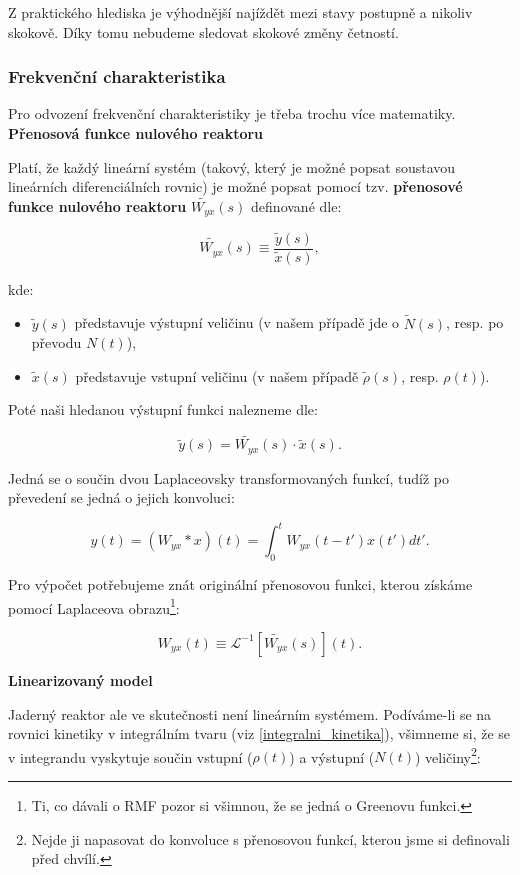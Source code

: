 Z praktického hlediska je výhodnější najíždět mezi stavy postupně a nikoliv skokově. Díky tomu nebudeme sledovat skokové změny četností.

\subsubsection{Frekvenční charakteristika}

Pro odvození frekvenční charakteristiky je třeba trochu více matematiky.\\

\textbf{Přenosová funkce nulového reaktoru}

Platí, že každý lineární systém (takový, který je možné popsat soustavou lineárních diferenciálních rovnic) je možné popsat pomocí tzv. \textbf{přenosové funkce nulového reaktoru} $\tilde{W_{yx}}(s)$ definované dle:

\begin{equation}
  \boxed{
  \tilde{W_{yx}}(s) \equiv \dfrac{\tilde{y}(s)}{\tilde{x}(s)},
  \label{prenosova_funkce_definice}}
\end{equation}

kde:

\begin{itemize}
  \item $\tilde{y}(s)$ představuje výstupní veličinu (v našem případě jde o $\tilde{N}(s)$, resp. po převodu $N(t)$),
  \item $\tilde{x}(s)$ představuje vstupní veličinu (v našem případě $\tilde{\rho}(s)$, resp. $\rho(t)$).
\end{itemize}

Poté naši hledanou výstupní funkci nalezneme dle:

$$ \tilde{y}(s) = \tilde{W_{yx}}(s) \cdot \tilde{x}(s). $$

Jedná se o součin dvou Laplaceovsky transformovaných funkcí, tudíž po převedení se jedná o jejich konvoluci:

$$ y(t) = (W_{yx} * x ) (t) = \int_0^t W_{yx}(t-t') x(t') dt'. $$

Pro výpočet potřebujeme znát originální přenosovou funkci, kterou získáme pomocí Laplaceova obrazu\footnote{Ti, co dávali o RMF pozor si všimnou, že se jedná o Greenovu funkci.}:

$$ W_{yx}(t) \equiv \mathcal{L}^{-1}[\tilde{W_{yx}}(s)](t). $$

\textbf{Linearizovaný model}

Jaderný reaktor ale ve skutečnosti není lineárním systémem. Podíváme-li se na rovnici kinetiky v integrálním tvaru (viz \eqref{integralni_kinetika}), všimneme si, že se v integrandu vyskytuje součin vstupní ($\rho(t)$) a výstupní ($N(t)$) veličiny\footnote{Nejde ji napasovat do konvoluce s přenosovou funkcí, kterou jsme si definovali před chvílí.}:

